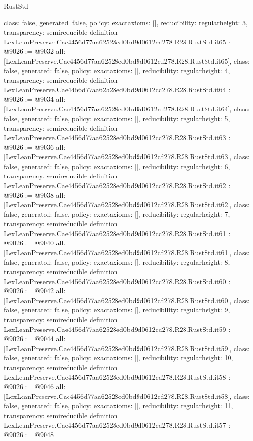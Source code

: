 \begin{lexlean}{RustStd}
\begin{coremodule}
{  class: false,
  generated: false,
  policy: exact{axioms: []},
  reducibility: regular{height: 3},
  transparency: semireducible
}
definition LexLeanPreserve.Cae4456d77aa62528ed0bd9d0612cd278.R28.RustStd.it65 : @9026 := @9032 {
  all: [LexLeanPreserve.Cae4456d77aa62528ed0bd9d0612cd278.R28.RustStd.it65],
  class: false,
  generated: false,
  policy: exact{axioms: []},
  reducibility: regular{height: 4},
  transparency: semireducible
}
definition LexLeanPreserve.Cae4456d77aa62528ed0bd9d0612cd278.R28.RustStd.it64 : @9026 := @9034 {
  all: [LexLeanPreserve.Cae4456d77aa62528ed0bd9d0612cd278.R28.RustStd.it64],
  class: false,
  generated: false,
  policy: exact{axioms: []},
  reducibility: regular{height: 5},
  transparency: semireducible
}
definition LexLeanPreserve.Cae4456d77aa62528ed0bd9d0612cd278.R28.RustStd.it63 : @9026 := @9036 {
  all: [LexLeanPreserve.Cae4456d77aa62528ed0bd9d0612cd278.R28.RustStd.it63],
  class: false,
  generated: false,
  policy: exact{axioms: []},
  reducibility: regular{height: 6},
  transparency: semireducible
}
definition LexLeanPreserve.Cae4456d77aa62528ed0bd9d0612cd278.R28.RustStd.it62 : @9026 := @9038 {
  all: [LexLeanPreserve.Cae4456d77aa62528ed0bd9d0612cd278.R28.RustStd.it62],
  class: false,
  generated: false,
  policy: exact{axioms: []},
  reducibility: regular{height: 7},
  transparency: semireducible
}
definition LexLeanPreserve.Cae4456d77aa62528ed0bd9d0612cd278.R28.RustStd.it61 : @9026 := @9040 {
  all: [LexLeanPreserve.Cae4456d77aa62528ed0bd9d0612cd278.R28.RustStd.it61],
  class: false,
  generated: false,
  policy: exact{axioms: []},
  reducibility: regular{height: 8},
  transparency: semireducible
}
definition LexLeanPreserve.Cae4456d77aa62528ed0bd9d0612cd278.R28.RustStd.it60 : @9026 := @9042 {
  all: [LexLeanPreserve.Cae4456d77aa62528ed0bd9d0612cd278.R28.RustStd.it60],
  class: false,
  generated: false,
  policy: exact{axioms: []},
  reducibility: regular{height: 9},
  transparency: semireducible
}
definition LexLeanPreserve.Cae4456d77aa62528ed0bd9d0612cd278.R28.RustStd.it59 : @9026 := @9044 {
  all: [LexLeanPreserve.Cae4456d77aa62528ed0bd9d0612cd278.R28.RustStd.it59],
  class: false,
  generated: false,
  policy: exact{axioms: []},
  reducibility: regular{height: 10},
  transparency: semireducible
}
definition LexLeanPreserve.Cae4456d77aa62528ed0bd9d0612cd278.R28.RustStd.it58 : @9026 := @9046 {
  all: [LexLeanPreserve.Cae4456d77aa62528ed0bd9d0612cd278.R28.RustStd.it58],
  class: false,
  generated: false,
  policy: exact{axioms: []},
  reducibility: regular{height: 11},
  transparency: semireducible
}
definition LexLeanPreserve.Cae4456d77aa62528ed0bd9d0612cd278.R28.RustStd.it57 : @9026 := @9048 {
}
\end{coremodule}
\end{lexlean}
